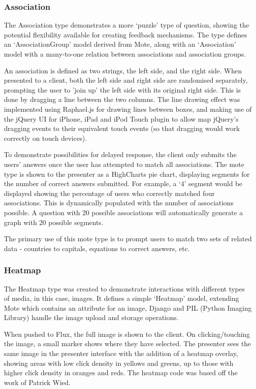 \documentclass[a4papert,11pt,notitlepage]{article}
\begin{document}
\subsubsection{Association}
The Association type demonstrates a more `puzzle' type of question, showing the potential flexibility available for creating feedback mechanisms. The type defines an `AssociationGroup' model derived from Mote, along with an `Association' model with a many-to-one relation between associations and association groups. 

An association is defined as two strings, the left side, and the right side. When presented to a client, both the left side and right side are randomised separately, prompting the user to 'join up' the left side with its original right side. This is done by dragging a line between the two columns. The line drawing effect was implemented using Raphael.js\cite{raphaeljs:web} for drawing lines between boxes, and making use of the jQuery UI for iPhone, iPad and iPod Touch\cite{jqueryuiipad:web} plugin to allow map jQuery's dragging events to their equivalent touch events (so that dragging would work correctly on touch devices).

To demonstrate possibilities for delayed response, the client only submits the users' answers once the user has attempted to match all associations. The mote type is shown to the presenter as a  HighCharts pie chart, displaying segments for the number of correct answers submitted. For example, a `4' segment would be displayed showing the percentage of users who correctly matched four associations. This is dynamically populated with the number of associations possible. A question with 20 possible associations will automatically generate a graph with 20 possible segments.

The primary use of this mote type is to prompt users to match two sets of related data - countries to capitals, equations to correct answers, etc.

\subsubsection{Heatmap}
The Heatmap type was created to demonstrate interactions with different types of media, in this case, images. It defines a simple `Heatmap' model, extending Mote which contains an attribute for an image, Django and PIL\cite{pil:web} (Python Imaging Library) handle the image upload and storage operations. 

When pushed to Flux, the full image is shown to the client. On clicking/touching the image, a small marker shows where they have selected. The presenter sees the same image in the presenter interface with the addition of a heatmap overlay, showing areas with low click density in yellows and greens, up to those with higher click density in oranges and reds. The heatmap code was based off the work of Patrick Wied\cite{heatmap:web}.
\end{document}
